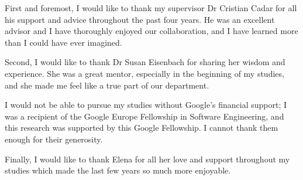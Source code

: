 \documentclass[a4paper,12pt,oneside,minionpro,dottedtoc]{thesis}
\begin{document}
\begin{acknowledgments}
\noindent
First and foremost, I would like to thank my supervisor Dr Cristian Cadar for
all his support and advice throughout the past four years. He was an excellent
advisor and I have thoroughly enjoyed our collaboration, and I have learned
more than I could have ever imagined.

\noindent
Second, I would like to thank Dr Susan Eisenbach for sharing her wisdom and
experience. She was a great mentor, especially in the beginning of my studies,
and she made me feel like a true part of our department.

\noindent
I would not be able to pursue my studies without Google's financial support; I
was a recipient of the Google Europe Fellowship in Software Engineering, and
this research was supported by this Google Fellowship. I cannot thank them
enough for their generosity.

\noindent
Finally, I would like to thank Elena for all her love and support throughout my
studies which made the last few years so much more enjoyable.
\end{acknowledgments}

\tableofcontents
\listoftables
\listoffigures
\lstlistoflistings

\cleardoublepage

\body











{
  \printbibliography
}

\appendix
\end{document}
